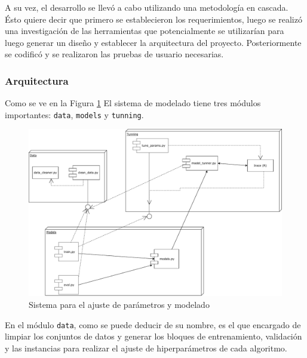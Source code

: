         \par A su vez, el desarrollo se llevó a cabo utilizando una metodología
          en cascada. Ésto quiere decir que primero se establecieron los
          requerimientos, luego se realizó una investigación de las
          herramientas que potencialmente se utilizarían para luego generar
          un diseño y establecer la arquitectura del proyecto. Posteriormente se codificó y se
          realizaron las pruebas de usuario necesarias.

      \subsubsection{Arquitectura}


        \par Como se ve en la Figura \ref{fig:sistema_modelado} El sistema de
          modelado tiene tres módulos importantes: \verb|data|, \verb|models| y
          \verb|tunning|.

          \begin{figure}[hbt]
          \centering%
          \includegraphics[width=1\textwidth]{images/sistema_modeling_mosquitos}%
          \caption{Sistema para el ajuste de parámetros y modelado}\label{fig:sistema_modelado}
          \end{figure}

        \par En el módulo \verb|data|, como se puede deducir de su nombre,
          es el que encargado de limpiar los conjuntos de datos y generar los
          bloques de entrenamiento, validación y las instancias para realizar
          el ajuste de hiperparámetros de cada algoritmo.

